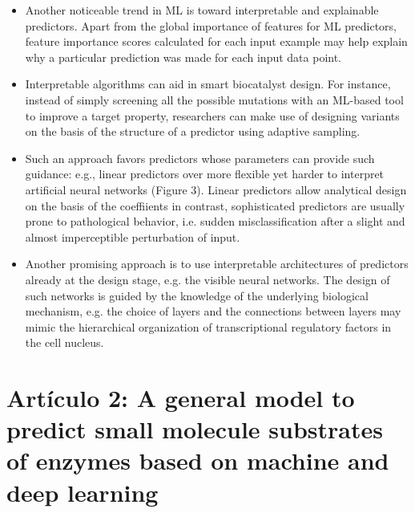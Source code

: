 \documentclass[12pt]{article}
\begin{document}
\begin{itemize}
\item Another noticeable trend in ML is toward interpretable and explainable predictors\cite{95}. Apart from the global importance of features for ML predictors, feature importance scores calculated for each input example\cite{96,97} may help explain why a particular prediction was made for each input data point. 


\item Interpretable algorithms can aid in smart biocatalyst design. For instance, instead of simply screening all the possible mutations with an ML-based tool to improve a target property, researchers can make use of designing variants on the basis of the structure of a predictor using adaptive sampling\cite{98}. 



\item Such an approach favors predictors whose parameters can provide such guidance: e.g., linear predictors over more ﬂexible yet harder to interpret artiﬁcial neural networks (Figure 3). Linear predictors allow analytical design on the basis of the coeffiients\cite{99} in contrast, sophisticated predictors are usually prone to pathological behavior, i.e. sudden misclassiﬁcation after a slight and almost imperceptible perturbation of input\cite{100}.


\item Another promising approach is to use interpretable architectures of predictors already at the design stage, e.g. the visible neural networks\cite{101}. The design of such networks is guided by the knowledge of the underlying biological mechanism, e.g. the choice of layers and the connections between layers may mimic the hierarchical organization of transcriptional regulatory factors in the cell nucleus.


\end{itemize}










\section{Artículo 2: A general model to predict small molecule substrates of enzymes based on machine and deep learning}
\end{document}
